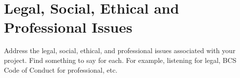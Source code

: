 
\chapter{Legal, Social, Ethical and Professional Issues}

Address the legal, social, ethical, and professional
issues associated with your project. Find something to say for each. For example, listening for legal,
BCS Code of Conduct for professional, etc.
